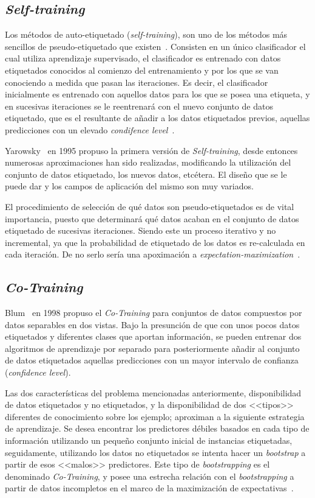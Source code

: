 \subsection{\textit{Self-training}}
Los métodos de auto-etiquetado (\textit{self-training}), son uno de los métodos más sencillos de pseudo-etiquetado que existen~\cite{triguero2015self}. Consisten en un único clasificador el cual utiliza aprendizaje supervisado, el clasificador es entrenado con datos etiquetados conocidos al comienzo del entrenamiento y por los que se van conociendo a medida que pasan las iteraciones. Es decir, el clasificador inicialmente es entrenado con aquellos datos para los que se posea una etiqueta, y en sucesivas iteraciones se le reentrenará con el nuevo conjunto de datos etiquetado, que es el resultante de añadir a los datos etiquetados previos, aquellas predicciones con un elevado \textit{condifence level}~\cite{jesper2020survey}.

Yarowsky~\cite{yarowsky1995unsupervised} en 1995 propuso la primera versión de \textit{Self-training}, desde entonces numerosas aproximaciones han sido realizadas, modificando la utilización del conjunto de datos etiquetado, los nuevos datos, etcétera. El diseño que se le puede dar y los campos de aplicación del mismo son muy variados.

El procedimiento de selección de qué datos son pseudo-etiquetados es de vital importancia, puesto que determinará qué datos acaban en el conjunto de datos etiquetado de sucesivas iteraciones. Siendo este un proceso iterativo y no incremental, ya que la probabilidad de etiquetado de los datos es re-calculada en cada iteración. De no serlo sería una apoximación a \textit{expectation-maximization}~\cite{dempster1977maximum}.

\subsection{\textit{Co-Training}}
Blum~\cite{blum1998combining} en 1998 propuso el \textit{Co-Training} para conjuntos de datos compuestos por datos separables en dos vistas. Bajo la presunción de que con unos pocos datos etiquetados y diferentes clases que aportan información, se pueden entrenar dos algoritmos de aprendizaje por separado para posteriormente añadir al conjunto de datos etiquetados aquellas predicciones con un mayor intervalo de confianza (\textit{confidence level}).

Las dos características del problema mencionadas anteriormente, disponibilidad de datos etiquetados y no etiquetados, y la disponibilidad de dos <<tipos>> diferentes de conocimiento sobre los ejemplo; aproximan a la siguiente estrategia de aprendizaje. Se desea encontrar los predictores débiles basados en cada tipo de información utilizando un pequeño conjunto inicial de instancias etiquetadas, seguidamente, utilizando los datos no etiquetados se intenta hacer un \textit{bootstrap} a partir de esos <<malos>> predictores. Este tipo de \textit{bootstrapping} es el denominado \textit{Co-Training}, y posee una estrecha relación con el \textit{bootstrapping} a partir de datos incompletos en el marco de la maximización de expectativas~\cite{ghahramani1994supervised, ratsaby1995learning}.

